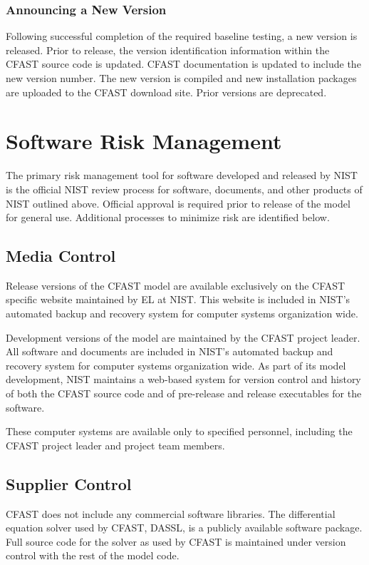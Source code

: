 \documentclass[12pt]{book}
\begin{document}
\subsection{Announcing a New Version}

Following successful completion of the required baseline testing, a new version is released.  Prior to release, the version identification information within the CFAST source code is updated.  CFAST documentation is updated to include the new version number.  The new version is compiled and new installation packages are uploaded to the CFAST download site.  Prior versions are deprecated.


\chapter{Software Risk Management}

The primary risk management tool for software developed and released by NIST is the official NIST review process for software, documents, and other products of NIST outlined above. Official approval is required prior to release of the model for general use. Additional processes to minimize risk are identified below.

\section{Media Control}

Release versions of the CFAST model are available exclusively on the CFAST specific website maintained by EL at NIST. This website is included in NIST's automated backup and recovery system for computer systems organization wide.

Development versions of the model are maintained by the CFAST project leader.  All software and documents are included in NIST's automated backup and recovery system for computer systems organization wide. As part of its model development, NIST maintains a web-based system for version control and history of both the CFAST source code and of pre-release and release executables for the software.

These computer systems are available only to specified personnel, including the CFAST project leader and project team members.

\section{Supplier Control}

CFAST does not include any commercial software libraries. The differential equation solver used by CFAST, DASSL, is a publicly available software package.  Full source code for the solver as used by CFAST is maintained under version control with the rest of the model code.
\end{document}
